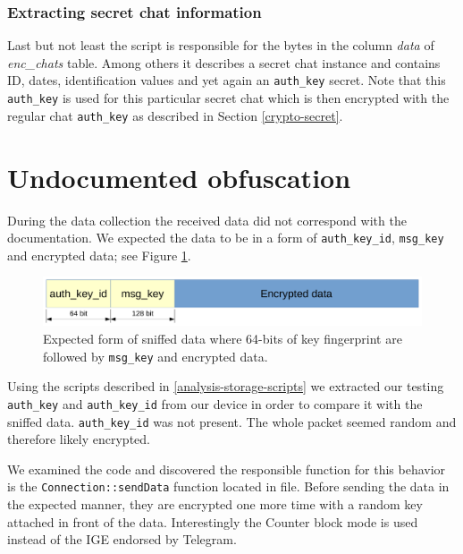 \documentclass[thesis=M,english]{FITthesis}[2012/10/20]
\begin{document}
\subsubsection{Extracting secret chat information}

Last but not least the  script is responsible for the bytes in the column \emph{data} of \emph{enc\_chats} table. Among others it describes a secret chat instance and contains ID, dates, identification values and yet again an \texttt{auth\_key} secret. Note that this \texttt{auth\_key} is used for this particular secret chat which is then encrypted with the regular chat \texttt{auth\_key} as described in Section \ref{crypto-secret}.

\section{Undocumented obfuscation}\label{analysis-obf}

During the data collection the received data did not correspond with the documentation. We expected the data to be in a form of \texttt{auth\_key\_id}, \texttt{msg\_key} and encrypted data; see Figure \ref{img:analysis-obf-expected}.

\begin{figure}[htb]
	\centering
	\includegraphics[width=1\textwidth]{sniffed-expected.pdf}
	\caption[Expected form of sniffed data]{Expected form of sniffed data where 64-bits of key fingerprint are followed by \texttt{msg\_key} and encrypted data.}
	\label{img:analysis-obf-expected}
\end{figure}

Using the scripts described in \ref{analysis-storage-scripts} we extracted our testing \texttt{auth\_key} and \texttt{auth\_key\_id} from our device in order to compare it with the sniffed data. \texttt{auth\_key\_id} was not present. The whole packet seemed random and therefore likely encrypted.

We examined the code and discovered the responsible function for this behavior is the \texttt{Connection::sendData} function located in  file. Before sending the data in the expected manner, they are encrypted one more time with a random key attached in front of the data. Interestingly the Counter block mode is used instead of the IGE endorsed by Telegram.
\end{document}
